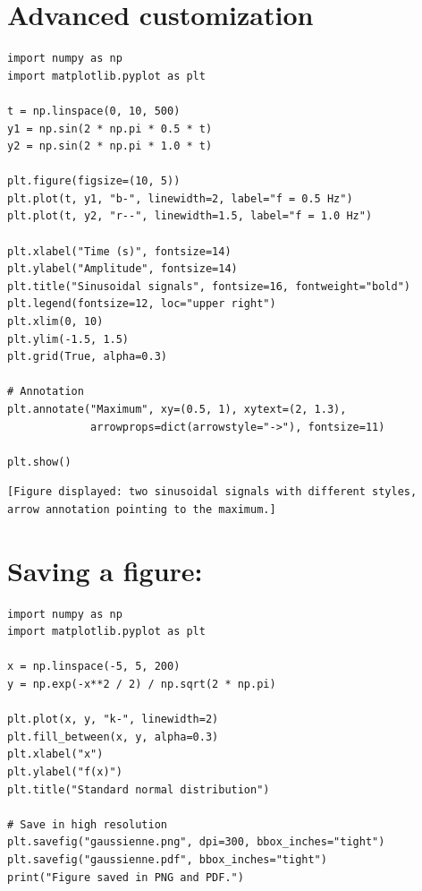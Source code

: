 \section{Advanced customization}

\begin{codeblock}[title=\textbf{Python}]
\begin{verbatim}
import numpy as np
import matplotlib.pyplot as plt

t = np.linspace(0, 10, 500)
y1 = np.sin(2 * np.pi * 0.5 * t)
y2 = np.sin(2 * np.pi * 1.0 * t)

plt.figure(figsize=(10, 5))
plt.plot(t, y1, "b-", linewidth=2, label="f = 0.5 Hz")
plt.plot(t, y2, "r--", linewidth=1.5, label="f = 1.0 Hz")

plt.xlabel("Time (s)", fontsize=14)
plt.ylabel("Amplitude", fontsize=14)
plt.title("Sinusoidal signals", fontsize=16, fontweight="bold")
plt.legend(fontsize=12, loc="upper right")
plt.xlim(0, 10)
plt.ylim(-1.5, 1.5)
plt.grid(True, alpha=0.3)

# Annotation
plt.annotate("Maximum", xy=(0.5, 1), xytext=(2, 1.3),
             arrowprops=dict(arrowstyle="->"), fontsize=11)

plt.show()
\end{verbatim}
\end{codeblock}

\begin{codeoutput}
\begin{verbatim}
[Figure displayed: two sinusoidal signals with different styles,
arrow annotation pointing to the maximum.]
\end{verbatim}
\end{codeoutput}

\section{Saving a figure: }

\begin{codeblock}[title=\textbf{Python}]
\begin{verbatim}
import numpy as np
import matplotlib.pyplot as plt

x = np.linspace(-5, 5, 200)
y = np.exp(-x**2 / 2) / np.sqrt(2 * np.pi)

plt.plot(x, y, "k-", linewidth=2)
plt.fill_between(x, y, alpha=0.3)
plt.xlabel("x")
plt.ylabel("f(x)")
plt.title("Standard normal distribution")

# Save in high resolution
plt.savefig("gaussienne.png", dpi=300, bbox_inches="tight")
plt.savefig("gaussienne.pdf", bbox_inches="tight")
print("Figure saved in PNG and PDF.")
\end{verbatim}
\end{codeblock}

